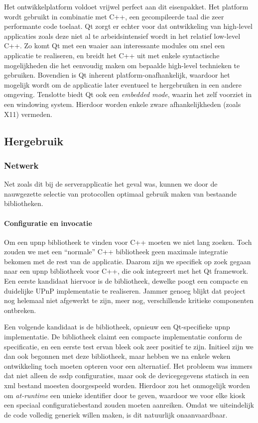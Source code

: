 Het ontwikkelplatform  voldoet vrijwel perfect aan dit eisenpakket. Het platform wordt gebruikt in combinatie met C++, een gecompileerde taal die zeer performante code toelaat. Qt zorgt er echter voor dat ontwikkeling van high-level applicaties zoals deze niet al te arbeidsintensief wordt in het relatief low-level C++. Zo komt Qt met een waaier aan interessante modules om snel een applicatie te realiseren, en breidt het C++ uit met enkele syntactische mogelijkheden die het eenvoudig maken om bepaalde high-level technieken te gebruiken. Bovendien is Qt inherent platform-onafhankelijk, waardoor het mogelijk wordt om de applicatie later eventueel te hergebruiken in een andere omgeving. Tenslotte biedt Qt ook een \emph{embedded mode}, waarin het zelf voorziet in een windowing system. Hierdoor worden enkele zware afhankelijkheden (zoals X11) vermeden.

\subsection{Hergebruik}

\subsubsection{Netwerk}

Net zoals dit bij de serverapplicatie het geval was, kunnen we door de nauwgezette selectie van protocollen optimaal gebruik maken van bestaande bibliotheken.

\paragraph{Configuratie en invocatie} Om een \ac{upnp} bibliotheek te vinden voor C++ moeten we niet lang zoeken. Toch zouden we met een ``normale'' C++ bibliotheek geen maximale integratie bekomen met de rest van de applicatie. Daarom zijn we specifiek op zoek gegaan naar een \ac{upnp} bibliotheek voor C++, die ook integreert met het Qt framework. Een eerste kandidaat hiervoor is de  bibliotheek, dewelke poogt een compacte en duidelijke UPnP implementatie te realiseren. Jammer genoeg blijkt dat project nog helemaal niet afgewerkt te zijn, meer nog, verschillende kritieke componenten ontbreken.

Een volgende kandidaat is de  bibliotheek, opnieuw een Qt-specifieke \ac{upnp} implementatie. De bibliotheek claimt een compacte implementatie conform de specificatie, en een eerste test ervan bleek ook zeer positief te zijn. Initieel zijn we dan ook begonnen met deze bibliotheek, maar hebben we na enkele weken ontwikkeling toch moeten opteren voor een alternatief. Het probleem was immers dat niet alleen de \ac{ssdp} configuraties, maar ook de devicegegevens statisch in een \ac{xml} bestand moesten doorgespeeld worden. Hierdoor zou het onmogelijk worden om \emph{at-runtime} een unieke identifier door te geven, waardoor we voor elke kiosk een speciaal configuratiebestand zouden moeten aanreiken. Omdat we uiteindelijk de code volledig generiek willen maken, is dit natuurlijk onaanvaardbaar.

